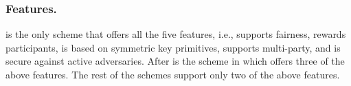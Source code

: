 \subsubsection{Features.} \epsi is the only scheme that offers all the five features, i.e., supports fairness, rewards participants, is based on symmetric key primitives, supports multi-party, and is secure against active adversaries. After \epsi is the scheme in \cite{NevoTY21} which offers three of the above features. The rest of the schemes support only two of the above features. 








